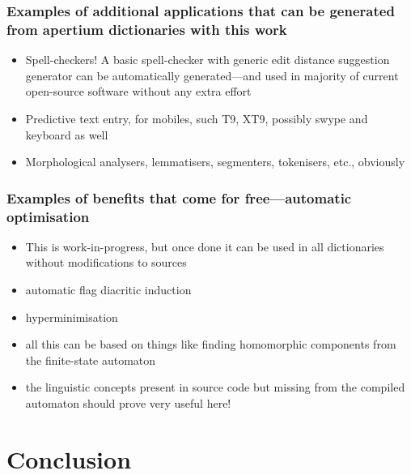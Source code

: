 \documentclass{beamer}
\begin{document}
\begin{frame}
    \frametitle{Examples of additional applications that can be generated from
    apertium dictionaries with this work}
    \begin{itemize}
        \item Spell-checkers! A basic spell-checker with generic edit distance
            suggestion generator can be automatically generated---and used in
            majority of current open-source software without any extra effort
        \item Predictive text entry, for mobiles, such T9, XT9, possibly swype
            and keyboard as well
        \item Morphological analysers, lemmatisers, segmenters, tokenisers,
            etc., obviously
    \end{itemize}
\end{frame}

\begin{frame}
    \frametitle{Examples of benefits that come for free---automatic optimisation}
    \begin{itemize}
        \item This is work-in-progress, but once done it can be used in all
            dictionaries without modifications to sources
        \item automatic flag diacritic induction
        \item hyperminimisation
        \item all this can be based on things like finding homomorphic
            components from the finite-state automaton
        \item the linguistic concepts present in source code but missing from
            the compiled automaton should prove very useful here!
    \end{itemize}
\end{frame}

\section{Conclusion}
\end{document}
